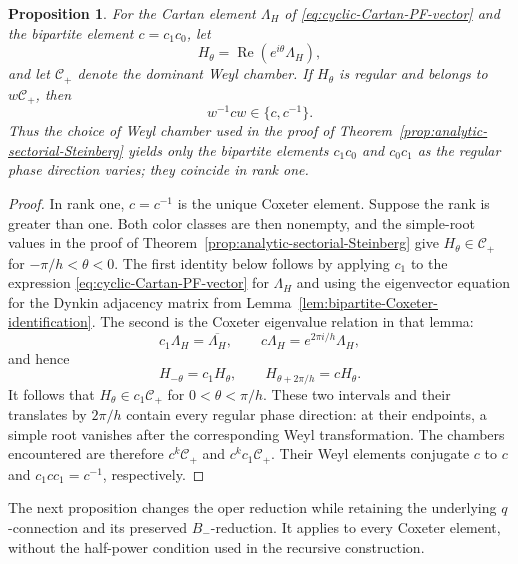 \documentclass[11pt,leqno]{amsart}
\numberwithin{equation}{section}
\theoremstyle{plain}
\newtheorem{proposition}[theorem]{Proposition}
\theoremstyle{definition}
\theoremstyle{plain}
\theoremstyle{definition}
\theoremstyle{remark}
\begin{document}
\begin{proposition}\label{prop:phase-Coxeter-orders}\label{rem:choice-Coxeter-element}
For the Cartan element $\Lambda_H$ of \eqref{eq:cyclic-Cartan-PF-vector} and the bipartite element $c=c_1c_0$, let
\[
 H_\theta=\operatorname{Re}(e^{i\theta}\Lambda_H),
\]
and let $\mathcal C_+$ denote the dominant Weyl chamber. If $H_\theta$ is regular and belongs to $w\mathcal C_+$, then
\[
 w^{-1}cw\in\{c,c^{-1}\}.
\]
Thus the choice of Weyl chamber used in the proof of Theorem~\ref{prop:analytic-sectorial-Steinberg} yields only the bipartite elements $c_1c_0$ and $c_0c_1$ as the regular phase direction varies; they coincide in rank one.
\end{proposition}
\begin{proof}
In rank one, $c=c^{-1}$ is the unique Coxeter element. Suppose the rank is greater than one. Both color classes are then nonempty, and the simple-root values in the proof of Theorem~\ref{prop:analytic-sectorial-Steinberg} give $H_\theta\in\mathcal C_+$ for $-\pi/h<\theta<0$. The first identity below follows by applying $c_1$ to the expression \eqref{eq:cyclic-Cartan-PF-vector} for $\Lambda_H$ and using the eigenvector equation for the Dynkin adjacency matrix from Lemma~\ref{lem:bipartite-Coxeter-identification}.  The second is the Coxeter eigenvalue relation in that lemma:
\[
 c_1\Lambda_H=\overline{\Lambda_H},
 \qquad c\Lambda_H=e^{2\pi i/h}\Lambda_H,
\]
and hence
\[
 H_{-\theta}=c_1H_\theta,\qquad
 H_{\theta+2\pi/h}=cH_\theta.
\]
It follows that $H_\theta\in c_1\mathcal C_+$ for $0<\theta<\pi/h$. These two intervals and their translates by $2\pi/h$ contain every regular phase direction: at their endpoints, a simple root vanishes after the corresponding Weyl transformation. The chambers encountered are therefore $c^k\mathcal C_+$ and $c^kc_1\mathcal C_+$. Their Weyl elements conjugate $c$ to $c$ and $c_1cc_1=c^{-1}$, respectively.
\end{proof}

The next proposition changes the oper reduction while retaining the underlying $q$-connection and its preserved $B_-$-reduction. It applies to every Coxeter element, without the half-power condition used in the recursive construction.
\end{document}
